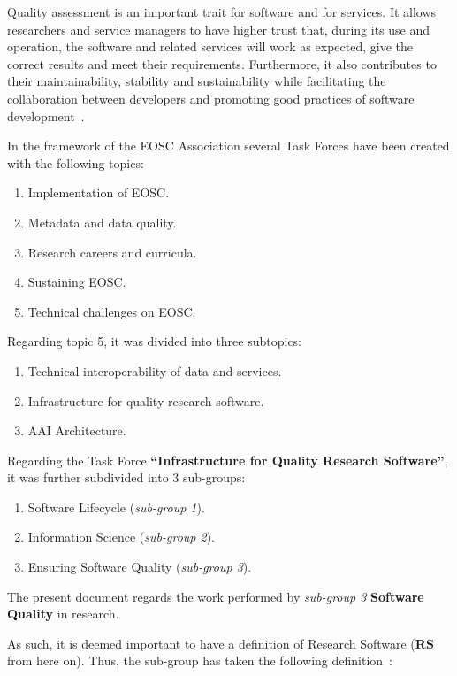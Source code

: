 Quality assessment is an important trait for software and for services. It allows researchers and service managers to have higher trust that, during its use and operation, the software and related services will work as expected, give the correct results and meet their requirements. Furthermore, it also contributes to their maintainability, stability and sustainability while facilitating the collaboration between developers and promoting good practices of software development~\cite{eosc_synergyD31}.

In the framework of the EOSC Association several Task Forces have been created with the following topics:

\begin{enumerate}
    \item Implementation of EOSC.
    \item Metadata and data quality.
    \item Research careers and curricula.
    \item Sustaining EOSC.
    \item Technical challenges on EOSC.
\end{enumerate}

Regarding topic 5, it was divided into three subtopics:

\begin{enumerate}
    \item Technical interoperability of data and services.
    \item Infrastructure for quality research software.
    \item AAI Architecture.
\end{enumerate}

Regarding the Task Force \textbf{``Infrastructure for Quality Research Software''}, it was further subdivided into 3 sub-groups:

\begin{enumerate}
    \item Software Lifecycle (\textit{sub-group 1}).
    \item Information Science (\textit{sub-group 2}).
    \item Ensuring Software Quality (\textit{sub-group 3}).
\end{enumerate}

The present document regards the work performed by \textit{sub-group 3} \textbf{Software Quality} in research.

As such, it is deemed important to have a definition of Research Software (\textbf{RS} from here on). Thus, the sub-group has taken the following definition~\cite{gruenpeter_defining_2021}: 

